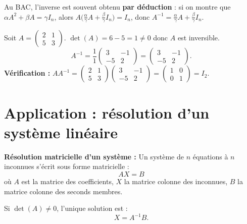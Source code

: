 \begin{astucebac}
	Au BAC, l'inverse est souvent obtenu \textbf{par déduction} :
	si on montre que $\alpha A^2 + \beta A = \gamma I_n$,
	alors $A\bigl(\frac{\alpha}{\gamma}A + \frac{\beta}{\gamma}I_n\bigr) = I_n$,
	donc $A^{-1} = \frac{\alpha}{\gamma}A + \frac{\beta}{\gamma}I_n$.
\end{astucebac}

\begin{exemple}
	Soit $A = \begin{pmatrix}2&1\\5&3\end{pmatrix}$.
	$\det(A)=6-5=1\neq 0$ donc $A$ est inversible.
	\[
	A^{-1} = \frac{1}{1}\begin{pmatrix}3&-1\\-5&2\end{pmatrix}
	= \begin{pmatrix}3&-1\\-5&2\end{pmatrix}.
	\]
	\textbf{Vérification :}
	$AA^{-1}=\begin{pmatrix}2&1\\5&3\end{pmatrix}\begin{pmatrix}3&-1\\-5&2\end{pmatrix}
	=\begin{pmatrix}1&0\\0&1\end{pmatrix}=I_2.$
\end{exemple}


\section{Application : résolution d'un système linéaire}

\begin{methode}
	\textbf{Résolution matricielle d'un système :}
	Un système de $n$ équations à $n$ inconnues s'écrit sous forme matricielle :
	\[
	AX = B
	\]
	où $A$ est la matrice des coefficients, $X$ la matrice colonne des inconnues,
	$B$ la matrice colonne des seconds membres.

	Si $\det(A)\neq 0$, l'unique solution est :
	\[
	\boxed{X = A^{-1}B.}
	\]
\end{methode}

